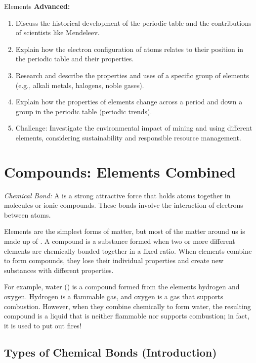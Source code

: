 \begin{tieredquestions}{Elements}
\textbf{Advanced:}
\begin{enumerate}
    \item Discuss the historical development of the periodic table and the contributions of scientists like Mendeleev.
    \item Explain how the electron configuration of atoms relates to their position in the periodic table and their properties.
    \item Research and describe the properties and uses of a specific group of elements (e.g., alkali metals, halogens, noble gases).
    \item  Explain how the properties of elements change across a period and down a group in the periodic table (periodic trends).
    \item Challenge:  Investigate the environmental impact of mining and using different elements, considering sustainability and responsible resource management.
\end{enumerate}
\end{tieredquestions}


\section{Compounds: Elements Combined}

\begin{marginnote}
\textit{Chemical Bond:}  A  is a strong attractive force that holds atoms together in molecules or ionic compounds.  These bonds involve the interaction of electrons between atoms.
\end{marginnote}

Elements are the simplest forms of matter, but most of the matter around us is made up of . A compound is a substance formed when two or more different elements are chemically bonded together in a fixed ratio.  When elements combine to form compounds, they lose their individual properties and create new substances with different properties.

For example, water () is a compound formed from the elements hydrogen and oxygen.  Hydrogen is a flammable gas, and oxygen is a gas that supports combustion. However, when they combine chemically to form water, the resulting compound is a liquid that is neither flammable nor supports combustion; in fact, it is used to put out fires!

\subsection{Types of Chemical Bonds (Introduction)}

